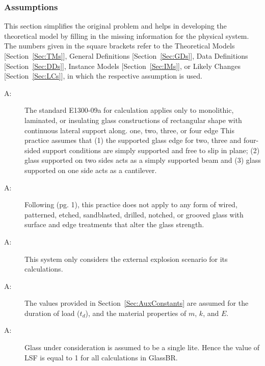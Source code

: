 \documentclass[12pt]{article}
\newcounter{assumpnum}
\newcommand{\atheassumpnum}{A\theassumpnum}
\begin{document}
\subsubsection{Assumptions}
\label{Sec:Assumps}
This section simplifies the original problem and helps in developing the theoretical model by filling in the missing information for the physical system. The numbers given in the square brackets refer to the Theoretical Models {[}Section~\ref{Sec:TMs}{]}, General Definitions {[}Section~\ref{Sec:GDs}{]}, Data Definitions {[}Section~\ref{Sec:DDs}{]}, Instance Models {[}Section~\ref{Sec:IMs}{]}, or Likely Changes {[}Section~\ref{Sec:LCs}{]}, in which the respective assumption is used.
\begin{description}
\item[\atheassumpnum\label{A:glassTyA}:]The standard E1300-09a for calculation applies only to monolithic, laminated, or insulating glass constructions of rectangular shape with continuous lateral support along. one, two, three, or four edge This practice assumes that (1) the supported glass edge for two, three and four-sided support conditions are simply supported and free to slip in plane; (2) glass supported on two sides acts as a simply supported beam and (3) glass supported on one side acts as a cantilever.
\end{description}
\begin{description}
\item[\atheassumpnum\label{A:glassConditionA}:]Following \cite{astm.LR2009} (pg. 1), this practice does not apply to any form of wired, patterned, etched, sandblasted, drilled, notched, or grooved glass with surface and edge treatments that alter the glass strength.
\end{description}
\begin{description}
\item[\atheassumpnum\label{A:explsnScenarioA}:]This system only considers the external explosion scenario for its calculations.
\end{description}
\begin{description}
\item[\atheassumpnum\label{A:standardValuesA}:]The values provided in Section~\ref{Sec:AuxConstants} are assumed for the duration of load (${t_{d}}$), and the material properties of $m$, $k$, and $E$.
\end{description}
\begin{description}
\item[\atheassumpnum\label{A:glassLiteA}:]Glass under consideration is assumed to be a single lite. Hence the value of LSF is equal to 1 for all calculations in GlassBR.
\end{description}
\end{document}
